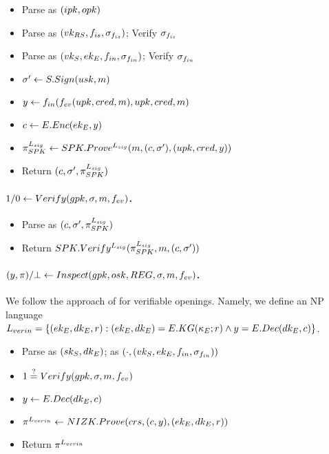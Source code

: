 \begin{itemize}
\item Parse \gpk as $(ipk,opk)$
\item Parse \ipk as $(vk_{RS},f_{is},\sigma_{f_{is}})$; Verify $\sigma_{f_{is}}$
\item Parse \opk as $(vk_{S},ek_{E},f_{in},\sigma_{f_{in}})$; Verify $\sigma_{f_{in}}$
\item $\sigma' \gets S.Sign(usk,m)$
\item %
  $y \gets f_{in}(f_{ev}(upk,cred,m),
  upk,cred,m)$%
\item $c \gets E.Enc(ek_{E},y)$
\item $\pi_{SPK}^{L_{sig}} \gets SPK.Prove^{L_{sig}}(m,(c,\sigma'),
  (upk,cred,y))$
\item Return $(c,\sigma',\pi_{SPK}^{L_{sig}})$
\end{itemize}

\paragraph{$1/0 \gets Verify(gpk,\sigma,m,f_{ev})$.} %
\begin{itemize}
\item Parse \sig as $(c,\sigma',\pi_{SPK}^{L_{sig}})$
\item Return $SPK.Verify^{L_{sig}}(\pi_{SPK}^{L_{sig}},m,(c,\sigma'))$ 
\end{itemize}

\paragraph{$(\y,\iproof)/\bot \gets \Inspect(\gpk,\osk,\trans,\sig,\msg,\feval)$.} %

We follow the approach of \cite{bsz05} for verifiable openings. Namely, we
define an NP language $L_{verin} = \lbrace (ek_{E},dk_{E},r):
(ek_{E},dk_{E}) = E.KG(\kappa_{E};r) \land y = E.Dec(dk_{E},c) \rbrace$.

\begin{itemize}
\item Parse \osk as $(sk_{S},dk_{E})$; \gpk as
  $(\cdot,(vk_{S},ek_{E},f_{in},\sigma_{f_{in}}))$
\item  $1 \stackrel{?}{=} Verify(gpk,\sigma,m,f_{ev})$  
\item $y \gets E.Dec(dk_{E},c)$
\item $\pi^{L_{verin}} \gets NIZK.Prove(crs,(c,y),(ek_{E},dk_{E},r))$
\item Return $\pi^{L_{verin}}$
\end{itemize}

